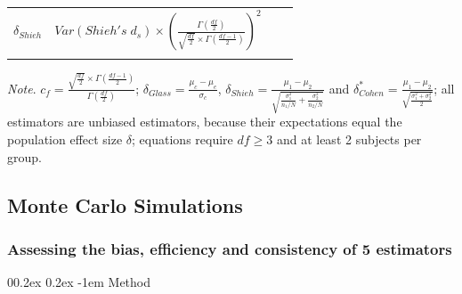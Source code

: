 \documentclass[
  english,
  man,floatsintext]{apa6}
\makeatletter
\let\oldparagraph\paragraph
\renewcommand{\paragraph}[1]{\oldparagraph{#1}\mbox{}}
\renewcommand{\paragraph}{\@startsection{paragraph}{4}{\parindent}%
  {0\baselineskip \@plus 0.2ex \@minus 0.2ex}%
  {-1em}%
  {\normalfont\normalsize\bfseries\itshape\typesectitle}}
\makeatother
\begin{document}
\begin{landscape}
\begin{longtable}[]{@{}lccc@{}}
\begin{minipage}[t]{0.16\columnwidth}
\(\delta_{Shieh}\)\strut
\end{minipage} & \begin{minipage}[t]{0.45\columnwidth}\centering
\(Var(Shieh's \; d_s) \times \left( \frac{\Gamma\left(\frac{df}{2} \right)}{\sqrt{\frac{df}{2}} \times \Gamma \left( \frac{df-1}{2}\right)}\right)^2\)\strut
\end{minipage}\tabularnewline
\begin{minipage}[t]{0.10\columnwidth}\raggedright
\strut
\end{minipage} & \begin{minipage}[t]{0.18\columnwidth}\centering
\strut
\end{minipage} & \begin{minipage}[t]{0.16\columnwidth}\centering
\strut
\end{minipage} & \begin{minipage}[t]{0.45\columnwidth}\centering
\strut
\end{minipage}\tabularnewline
\bottomrule
\end{longtable}

\emph{Note}. \(c_f=\frac{\sqrt{\frac{df}{2}} \times \Gamma\left( \frac{df-1}{2}\right)}{\Gamma\left( \frac{df}{2}\right)}\); \(\delta_{Glass}=\frac{\mu_c-\mu_e}{\sigma_c}\), \(\delta_{Shieh}=\frac{\mu_1-\mu_2}{\sqrt{\frac{\sigma^2_1}{n_1/N}+\frac{\sigma^2_2}{n_2/N}}}\) and \(\delta^*_{Cohen}=\frac{\mu_1-\mu_2}{\sqrt{\frac{\sigma^2_1+\sigma^2_2}{2}}}\); all estimators are unbiased estimators, because their expectations equal the population effect size \(\delta\); equations require \(df \ge 3\) and at least 2 subjects per group.

\end{landscape}
\newpage

\hypertarget{monte-carlo-simulations}{%
\subsection{Monte Carlo Simulations}\label{monte-carlo-simulations}}

\hypertarget{assessing-the-bias-efficiency-and-consistency-of-5-estimators}{%
\subsubsection{Assessing the bias, efficiency and consistency of 5 estimators}\label{assessing-the-bias-efficiency-and-consistency-of-5-estimators}}

\hypertarget{method}{%
\paragraph{Method}\label{method}}
\end{document}
